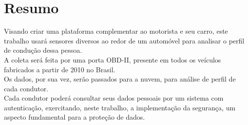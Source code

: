 \chapter*{Resumo}

\noindent Visando criar uma plataforma complementar ao motorista e seu carro, este trabalho usará sensores diversos ao redor de um automóvel para analisar o perfil de condução dessa pessoa.\\
A coleta será feita por uma porta OBD-II, presente em todos os veículos fabricados a partir de 2010 no Brasil.\\ 
Os dados, por sua vez, serão passados para a nuvem, para análise de perfil de cada condutor.\\ 
Cada condutor poderá consultar seus dados pessoais por um sistema com autenticação, exercitando, neste trabalho, a implementação da segurança, um aspecto fundamental para a proteção de dados.
